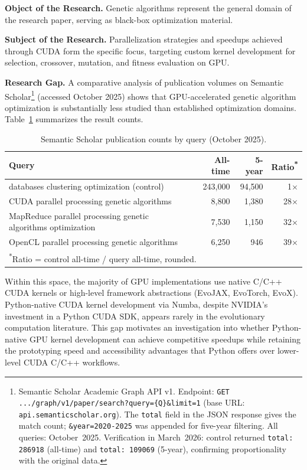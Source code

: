     \bigskip\textbf{Object of the Research.} Genetic algorithms represent the general domain of the research paper, serving as black-box optimization material.

    \bigskip\textbf{Subject of the Research.} Parallelization strategies and speedups achieved through CUDA form the specific focus, targeting custom kernel development for selection, crossover, mutation, and fitness evaluation on GPU.
    ​

    \bigskip\textbf{Research Gap.} A comparative analysis of publication volumes on Semantic Scholar\footnote{Semantic Scholar Academic Graph API v1. Endpoint: \texttt{GET .../graph/v1/paper/\allowbreak search?\allowbreak query=\{Q\}\&limit=1} (base URL: \texttt{api.semanticscholar.org}). The \texttt{total} field in the JSON response gives the match count; \texttt{\&year=2020-2025} was appended for five-year filtering. All queries: October~2025. Verification in March~2026: control returned \texttt{total:\,286918} (all-time) and \texttt{total:\,109069} (5-year), confirming proportionality with the original data.} (accessed October 2025) shows that GPU-accelerated genetic algorithm optimization is substantially less studied than established optimization domains. Table~\ref{tab:ss-gap} summarizes the result counts.

    \begin{table}[h]
    \centering
    \caption{Semantic Scholar publication counts by query (October 2025).}
    \label{tab:ss-gap}
    \small
    \begin{tabular}{p{}rrr}
    \hline
    \textbf{Query} & \textbf{All-time} & \textbf{5-year} & \textbf{Ratio}\textsuperscript{*} \\
    \hline
    databases clustering optimization (control) & 243{,}000 & 94{,}500 & 1$\times$ \\
    CUDA parallel processing genetic algorithms & 8{,}800 & 1{,}380 & 28$\times$ \\
    MapReduce parallel processing genetic algorithms optimization & 7{,}530 & 1{,}150 & 32$\times$ \\
    OpenCL parallel processing genetic algorithms & 6{,}250 & 946 & 39$\times$ \\
    \hline
    \multicolumn{4}{l}{\textsuperscript{*}Ratio = control all-time / query all-time, rounded.}
    \end{tabular}
    \end{table}

    Within this space, the majority of GPU implementations use native C/C++ CUDA kernels or high-level framework abstractions (EvoJAX, EvoTorch, EvoX). Python-native CUDA kernel development via Numba, despite NVIDIA's investment in a Python CUDA SDK, appears rarely in the evolutionary computation literature. This gap motivates an investigation into whether Python-native GPU kernel development can achieve competitive speedups while retaining the prototyping speed and accessibility advantages that Python offers over lower-level CUDA C/C++ workflows.

